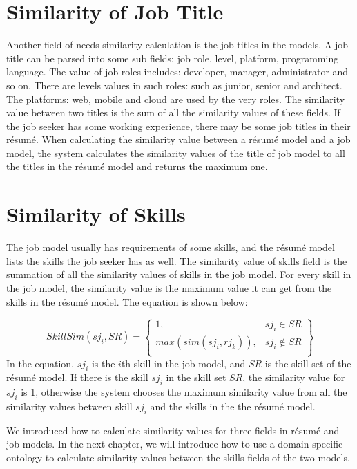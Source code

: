 \section{Similarity of Job Title}
Another field of needs similarity calculation is the job titles in the models. A job title can be parsed into some sub fields: job role, level, platform, programming language.  The value of job roles includes: developer, manager, administrator and so on. There are levels values in such roles: such as junior, senior and architect. The platforms: web, mobile and cloud are used by the very roles.  The similarity value between two titles is the sum of all the similarity values of these fields. If the job seeker has some working experience, there may be some job titles in their r\'esum\'e.  When calculating the similarity value between a r\'esum\'e model and a job model, the system calculates the similarity values of the title of job model to all the titles in the r\'esum\'e model and returns the maximum one.

\section{Similarity of Skills}

The job model usually has requirements of some skills, and the r\'esum\'e model lists the skills the job seeker has as well. The similarity value of skills field is the summation of all the similarity values of skills in the job model. For every skill in the job model, the similarity value is the maximum value it can get from the skills in the r\'esum\'e model. The equation is shown below: 

$$ SkillSim(sj_i,SR ) = \begin{Bmatrix}
1, & sj_i \in SR  \\
max( sim (sj_i, rj_k )), & sj_i \notin SR \\ 
\end{Bmatrix} $$
In the equation, $sj_i$ is the $i$th skill in the job model, and $SR$ is the skill set of the r\'esum\'e model. If there is the skill $sj_i$ in the skill set $SR$, the similarity value for $sj_i$ is 1, otherwise the system chooses the maximum similarity value from all the similarity values between skill $sj_i$ and the skills in the the r\'esum\'e model.

We introduced how to calculate similarity values for three fields in r\'esum\'e and job models. In the next chapter, we will introduce how to use a domain specific ontology to calculate similarity values between the skills fields of the two models.





